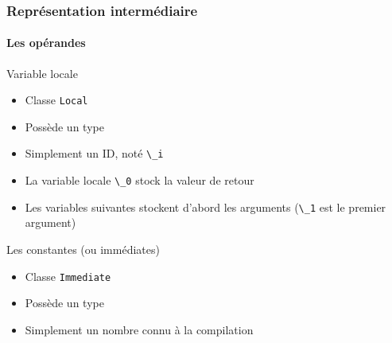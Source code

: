 \documentclass{beamer}
\newcommand*{\local}[1]{\lstinline|\_#1|}
\begin{document}
\begin{frame}
    \frametitle{Représentation intermédiaire}
    \framesubtitle{Les opérandes}
    \begin{block}{Variable locale}
        \begin{itemize}
            \item Classe \lstinline{Local}
            \item Possède un type
            \item Simplement un ID, noté \local{i}
            \item La variable locale \local{0} stock la valeur de retour
            \item Les variables suivantes stockent d'abord les arguments (\local{1} est le premier argument)
        \end{itemize}
    \end{block}
    \pause
    \begin{block}{Les constantes (ou immédiates)}
        \begin{itemize}
            \item Classe \lstinline{Immediate}
            \item Possède un type
            \item Simplement un nombre connu à la compilation
        \end{itemize}
    \end{block}
\end{frame}
\end{document}
